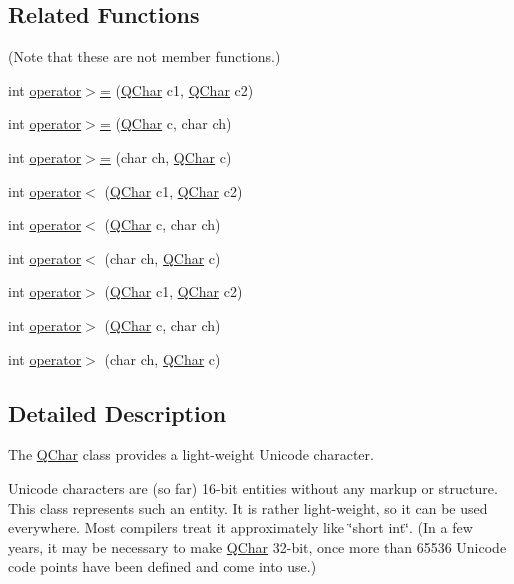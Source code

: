\subsection*{Related Functions}
(Note that these are not member functions.) \begin{DoxyCompactItemize}
\item 
int \mbox{\hyperlink{class_q_char_a4b5fd192cc790217e8be92350c712f96}{operator$>$=}} (\mbox{\hyperlink{class_q_char}{Q\+Char}} c1, \mbox{\hyperlink{class_q_char}{Q\+Char}} c2)
\item 
int \mbox{\hyperlink{class_q_char_a76a11bfd8c91c16da6b67111e0f425f5}{operator$>$=}} (\mbox{\hyperlink{class_q_char}{Q\+Char}} c, char ch)
\item 
int \mbox{\hyperlink{class_q_char_acaf747a14f95126f00a60b1e25826449}{operator$>$=}} (char ch, \mbox{\hyperlink{class_q_char}{Q\+Char}} c)
\item 
int \mbox{\hyperlink{class_q_char_a15002b2e206a26c172b93257b8502dd5}{operator$<$}} (\mbox{\hyperlink{class_q_char}{Q\+Char}} c1, \mbox{\hyperlink{class_q_char}{Q\+Char}} c2)
\item 
int \mbox{\hyperlink{class_q_char_a71f5a053f96ceccb5a6cbeb88a164235}{operator$<$}} (\mbox{\hyperlink{class_q_char}{Q\+Char}} c, char ch)
\item 
int \mbox{\hyperlink{class_q_char_a1337fd200b0e581e8ac7f54460bbbc39}{operator$<$}} (char ch, \mbox{\hyperlink{class_q_char}{Q\+Char}} c)
\item 
int \mbox{\hyperlink{class_q_char_abc2415ff906b00a6fd8fda1587a5a8de}{operator$>$}} (\mbox{\hyperlink{class_q_char}{Q\+Char}} c1, \mbox{\hyperlink{class_q_char}{Q\+Char}} c2)
\item 
int \mbox{\hyperlink{class_q_char_a4c094bd4eb0c8476013d9c453278e66a}{operator$>$}} (\mbox{\hyperlink{class_q_char}{Q\+Char}} c, char ch)
\item 
int \mbox{\hyperlink{class_q_char_a73c1424f57eae2e721b34e5e242fa39d}{operator$>$}} (char ch, \mbox{\hyperlink{class_q_char}{Q\+Char}} c)
\end{DoxyCompactItemize}


\subsection{Detailed Description}
The \mbox{\hyperlink{class_q_char}{Q\+Char}} class provides a light-\/weight Unicode character. 

Unicode characters are (so far) 16-\/bit entities without any markup or structure. This class represents such an entity. It is rather light-\/weight, so it can be used everywhere. Most compilers treat it approximately like \char`\"{}short int\char`\"{}. (In a few years, it may be necessary to make \mbox{\hyperlink{class_q_char}{Q\+Char}} 32-\/bit, once more than 65536 Unicode code points have been defined and come into use.)

